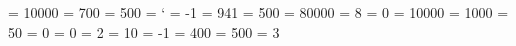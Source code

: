 \adjdemerits = 10000            %
\binoppenalty = 700             %
\clubpenalty = 500              %
 = `\-        %
 = -1           %
\delimiterfactor = 941          %
\displaywidowpenalty = 500      %
\doublehyphendemerits = 80000   %
\errorcontextlines = 8          %
\exhyphenpenalty = 0            %
\finalhyphendemerits = 10000    %
\hbadness = 1000                %
\hyphenpenalty = 50             %
\interlinepenalty = 0           %
\language = 0                   %
\lefthyphenmin = 2              %
\linepenalty = 10               %
\newlinechar = -1               %
\pretolerance = 400             %
\relpenalty = 500               %
\righthyphenmin = 3             %
